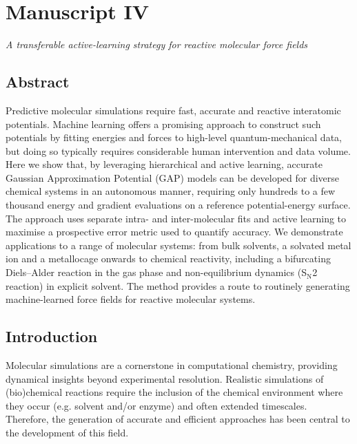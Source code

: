 \documentclass[../../main.tex]{subfiles}
\begin{document}
\vspace{-0.2cm}
\section{Manuscript IV}
{{\emph{A transferable active-learning strategy for reactive molecular force fields}}}

\subsection{Abstract}

Predictive molecular simulations require fast, accurate and reactive interatomic potentials. Machine learning offers a promising approach to construct such potentials by fitting energies and forces to high-level quantum-mechanical data, but doing so typically requires considerable human intervention and data volume. Here we show that, by leveraging hierarchical and active learning, accurate Gaussian Approximation Potential (GAP) models can be developed for diverse chemical systems in an autonomous manner, requiring only hundreds to a few thousand energy and gradient evaluations on a reference potential-energy surface. The approach uses separate intra- and inter-molecular fits and active learning to maximise a prospective error metric used to quantify accuracy. We demonstrate applications to a range of molecular systems: from bulk solvents, a solvated metal ion and a metallocage onwards to chemical reactivity, including a bifurcating Diels–Alder reaction in the gas phase and non-equilibrium dynamics (S${}_\text{N}$2 reaction) in explicit solvent. The method provides a route to routinely generating machine-learned force fields for reactive molecular systems. 


\subsection{Introduction}

Molecular simulations are a cornerstone in computational chemistry, providing dynamical insights beyond experimental resolution.\cite{Frenkel2002} Realistic simulations of (bio)chemical reactions require the inclusion of the chemical environment where they occur (e.g. solvent and/or enzyme) and often extended timescales. Therefore, the generation of accurate and efficient approaches has been central to the development of this field.
\end{document}
